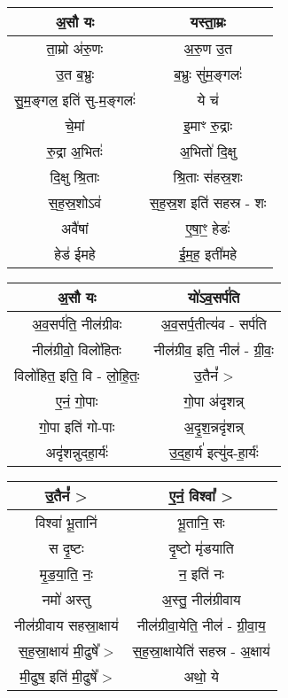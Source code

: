 {\centering
\begin{longtable}{|c|c|}
\hline
अ॒सौ यः                   & यस्ता॒म्रः\\
\hline
ता॒म्रो अ॑रु॒णः               & अ॒रु॒ण उ॒त\\
\hline
उ॒त ब॒भ्रुः                  & ब॒भ्रुः सु॑म॒ङ्गलः॑\\
\hline
सु॒म॒ङ्गल॒ इति॑ सु-म॒ङ्गलः॑        & ये च॑\\
\hline
चे॒मां                      & इ॒माꣳ रु॒द्राः\\
\hline
रु॒द्रा अ॒भितः॑               & अ॒भितो॑ दि॒क्षु\\
\hline
दि॒क्षु श्रि॒ताः              & श्रि॒ताः स॑हस्र॒शः\\
\hline
स॒ह॒स्र॒शोऽव॑                 & स॒ह॒स्र॒श इति॑ सहस्र - शः\\
\hline
अवै॑षां                     & ए॒षा॒ꣳ॒ हेडः॑\\
\hline
हेड॑ ईमहे                   & ई॒म॒ह॒ इती॑महे\\
\hline
\end{longtable}
}
{\centering
\begin{longtable}{|c|c|}
\hline
अ॒सौ यः                   & यो॑ऽव॒सर्प॑ति\\
\hline
अ॒व॒सर्प॑ति॒ नील॑ग्रीवः         & अ॒व॒सर्प॒तीत्य॑व - सर्प॑ति\\
\hline
नील॑ग्रीवो॒ विलो॑हितः        & नील॑ग्रीव॒ इति॒ नील॑ - ग्री॒वः॒\\
\hline
विलो॑हित॒ इति॒ वि - लो॒हि॒तः॒  & उ॒तैनं᳚ >\\
\hline
ए॒नं॒ गो॒पाः                 & गो॒पा अ॑दृशन्न्\\
\hline
गो॒पा इति॑ गो-पाः          & अ॒दृ॒श॒न्नदृ॑शन्न्\\
\hline
अदृ॑शन्नुदहा॒र्यः॑              & उ॒द॒हा॒र्य॑ इत्यु॑द-हा॒र्यः॑\\
\hline
\end{longtable}
}
{\centering
\begin{longtable}{|c|c|}
\hline
उ॒तैनं᳚ >                    & ए॒नं॒ विश्वा᳚ >\\
\hline
विश्वा॑ भू॒तानि॑              & भू॒तानि॒ सः\\
\hline
स दृ॒ष्टः                   & दृ॒ष्टो मृ॑डयाति\\
\hline
मृ॒ड॒या॒ति॒ नः॒                & न॒ इति॑ नः\\
\hline
नमो॑ अस्तु                  & अ॒स्तु॒ नील॑ग्रीवाय\\
\hline
नील॑ग्रीवाय सहस्रा॒क्षाय॑      & नील॑ग्रीवा॒येति॒ नील॑ - ग्री॒वा॒य॒\\
\hline
स॒ह॒स्रा॒क्षाय॑ मी॒ढुषे᳚ >         & स॒ह॒स्रा॒क्षायेति॑ सहस्र - अ॒क्षाय॑\\
\hline
मी॒ढुष॒ इति॑ मी॒ढुषे᳚ >          & अथो॒ ये\\
\hline
\end{longtable}
}
